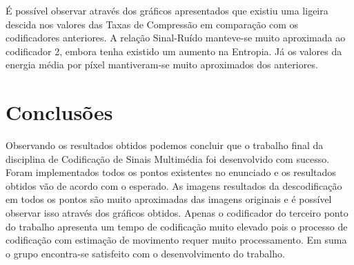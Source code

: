 \documentclass[12pt,a4paper]{article}
\begin{document}
É possível observar através dos gráficos apresentados que existiu uma ligeira descida nos valores das Taxas de Compressão em comparação com os codificadores anteriores. A relação Sinal-Ruído manteve-se muito aproximada ao codificador 2, embora tenha existido um aumento na Entropia. Já os valores da energia média por píxel mantiveram-se muito aproximados dos anteriores.

\section{Conclusões}
Observando os resultados obtidos podemos concluir que o trabalho final da disciplina de Codificação de Sinais Multimédia foi desenvolvido com sucesso. Foram implementados todos os pontos existentes no enunciado e os resultados obtidos vão de acordo com o esperado. As imagens resultados da descodificação em todos os pontos são muito aproximadas das imagens originais e é possível observar isso através dos gráficos obtidos. Apenas o codificador do terceiro ponto do trabalho apresenta um tempo de codificação muito elevado pois o processo de codificação com estimação de movimento requer muito processamento. Em suma o grupo encontra-se satisfeito com o desenvolvimento do trabalho.
\end{document}
